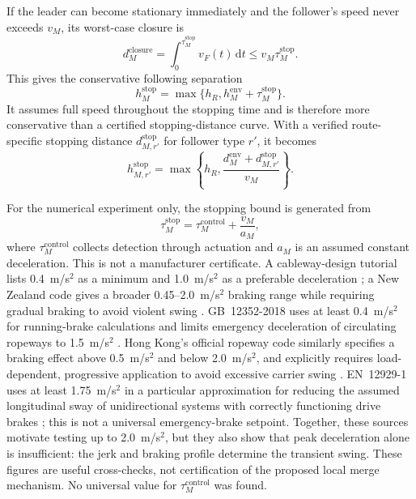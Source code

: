 \documentclass[11pt,a4paper]{scrartcl}
\begin{document}
If the leader can become stationary immediately and the follower's speed never
exceeds $v_M$, its worst-case closure is
\[
d_M^{\mathrm{closure}}
 =\int_0^{\tau_M^{\mathrm{stop}}}v_F(t)\,\mathrm dt
 \le v_M\tau_M^{\mathrm{stop}}.
\]
This gives the conservative following separation
\begin{equation}
h_M^{\mathrm{stop}}
 =\max\{h_R,h_M^{\mathrm{env}}+\tau_M^{\mathrm{stop}}\}.
\label{eq:merge-safe-headway}
\end{equation}
It assumes full speed throughout the stopping time and is therefore more
conservative than a certified stopping-distance curve.  With a verified
route-specific stopping distance $d_{M,r'}^{\mathrm{stop}}$ for follower type
$r'$, it becomes
\[
h_{M,r'}^{\mathrm{stop}}
=\max\left\{h_R,\frac{d_M^{\mathrm{env}}+d_{M,r'}^{\mathrm{stop}}}{v_M}\right\}.
\]

For the numerical experiment only, the stopping bound is generated from
\begin{equation}
\tau_M^{\mathrm{stop}}=\tau_M^{\mathrm{control}}+\frac{v_M}{a_M},
\label{eq:illustrative-stop-time}
\end{equation}
where $\tau_M^{\mathrm{control}}$ collects detection through actuation and
$a_M$ is an assumed constant deceleration.  This is not a manufacturer
certificate.  A cableway-design tutorial lists 0.4~m/s$^2$ as a minimum and
1.0~m/s$^2$ as a preferable deceleration \cite{dallachiara2022}; a New Zealand
code gives a broader 0.45--2.0~m/s$^2$ braking range while requiring gradual
braking to avoid violent swing \cite{nzRopewayCode1998}.  GB~12352-2018 uses at
least 0.4~m/s$^2$ for running-brake calculations and limits emergency
deceleration of circulating ropeways to 1.5~m/s$^2$ \cite{gb12352}.  Hong
Kong's official ropeway code similarly specifies a braking effect above
0.5~m/s$^2$ and below 2.0~m/s$^2$, and explicitly requires load-dependent,
progressive application to avoid excessive carrier swing \cite{hkRopewayCode2018}.
EN~12929-1 uses at least 1.75~m/s$^2$ in a particular approximation for reducing
the assumed longitudinal sway of unidirectional systems with correctly
functioning drive brakes \cite[Sec.~6.3.5]{en12929}; this is not a universal
emergency-brake setpoint.  Together, these sources motivate testing up to
2.0~m/s$^2$, but they also show that peak deceleration alone is insufficient:
the jerk and braking profile determine the transient swing.  These figures are
useful cross-checks, not certification of the proposed local merge mechanism.
No universal value for $\tau_M^{\mathrm{control}}$ was found.
\end{document}
